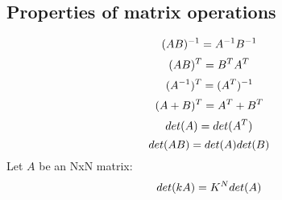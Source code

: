\documentclass[11pt, a4paper, oneside]{book}
\begin{document}
\subsection{Properties of matrix operations}
\begin{equation*} 
\large{(AB)^{-1} = A^{-1}B^{-1}}\\
\end{equation*}
\begin{equation*} 
\large{(AB)^{T} = B^{T}A^{T}}\\
\end{equation*}
\begin{equation*} 
\large{(A^{-1})^{T} = (A^{T})^{-1}}\\
\end{equation*}
\begin{equation*} 
\large{(A+B)^{T} = A^{T} + B^{T}}\\
\end{equation*}
\begin{equation*} 
\large{det(A) = det(A^{T})}\\
\end{equation*}
\begin{equation*} 
\large{det(AB) = det(A)det(B)}\\
\end{equation*}
\large{Let $A$ be an NxN matrix:}
\begin{equation*} 
\large{det(kA) = K^Ndet(A)}\\
\end{equation*}
\end{document}
